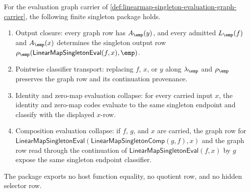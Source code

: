 \begin{theorem}
\label{thm:linearmap-singleton-evaluation-graph-package}
For the evaluation graph carrier of
\autoref{def:linearmap-singleton-evaluation-graph-carrier}, the following
finite singleton package holds.
\begin{enumerate}
  \item Output closure: every graph row has $A_{\emp}(y)$, and every admitted
  $L_{\emp}(f)$ and $A_{\emp}(x)$ determines the singleton output row
  $\rho_{\emp}(\mathsf{LinearMapSingletonEval}(f,x),\emp)$.
  \item Pointwise classifier transport: replacing $f$, $x$, or $y$ along
  $\lambda_{\emp}$ and $\rho_{\emp}$ preserves the graph row and its
  continuation provenance.
  \item Identity and zero-map evaluation collapse: for every carried input
  $x$, the identity and zero-map codes evaluate to the same singleton endpoint
  and classify with the displayed $x$-row.
  \item Composition evaluation collapse: if $f$, $g$, and $x$ are carried, the
  graph row for
  $\mathsf{LinearMapSingletonEval}(\mathsf{LinearMapSingletonComp}(g,f),x)$
  and the graph row read through the continuation of
  $\mathsf{LinearMapSingletonEval}(f,x)$ by $g$ expose the same singleton
  endpoint classifier.
\end{enumerate}
The package exports no host function equality, no quotient row, and no hidden
selector row.
\end{theorem}
